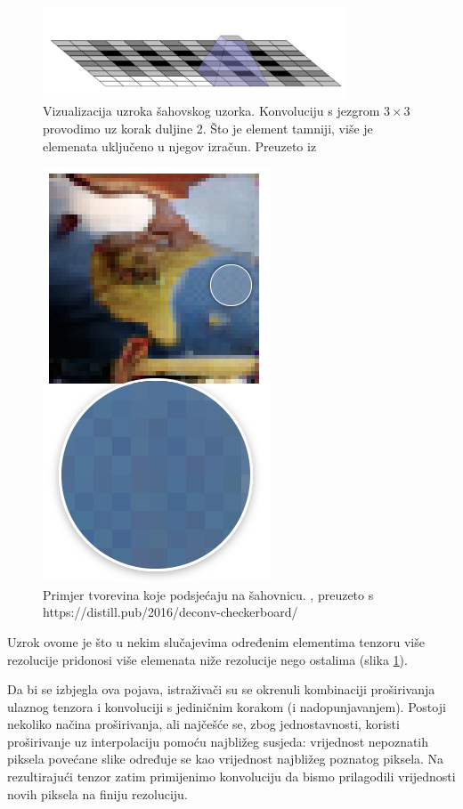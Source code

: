 \begin{figure}[h]
\centering
		\includegraphics[width=0.8\textwidth]{images/checkers_reason.png}
\caption{Vizualizacija uzroka šahovskog uzorka. Konvoluciju s jezgrom $3 \times 3$ provodimo uz korak duljine 2. Što je element tamniji, više je elemenata uključeno u njegov izračun. Preuzeto iz \cite{odena2016deconvolution}}
\label{checkers_reason}
\end{figure}
		
\begin{figure}[h]
\centering
		\includegraphics[height=0.5\textwidth]{images/checkers.png}
\caption{Primjer tvorevina koje podsjećaju na šahovnicu. \cite{dumoulin2016adversarially}, preuzeto s https://distill.pub/2016/deconv-checkerboard/}
\label{checkerboard}
\end{figure}

Uzrok ovome je što u nekim slučajevima određenim elementima tenzoru više rezolucije pridonosi više elemenata niže rezolucije nego ostalima (slika \ref{checkers_reason}). 

Da bi se izbjegla ova pojava, istraživači su se okrenuli kombinaciji proširivanja ulaznog tenzora i konvoluciji s jediničnim korakom (i nadopunjavanjem). Postoji nekoliko načina proširivanja, ali najčešće se, zbog jednostavnosti, koristi proširivanje uz interpolaciju pomoću najbližeg susjeda: vrijednost nepoznatih piksela povećane slike određuje se kao vrijednost najbližeg poznatog piksela. Na rezultirajući tenzor zatim primijenimo konvoluciju da bismo prilagodili vrijednosti novih piksela na finiju rezoluciju.  